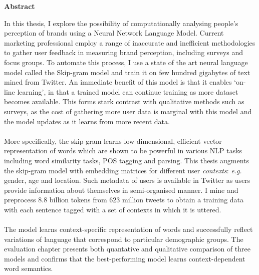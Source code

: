 \newpage
{\Huge \bf Abstract}
\vspace{24pt} 
\onehalfspacing


In this thesis, I explore the possibility of computationally analysing people's perception of brands using a Neural Network Language Model. Current marketing professional employ a range of inaccurate and inefficient methodologies to gather user feedback in measuring brand perception, including surveys and focus groups. To automate this process, I use a state of the art neural language model called the Skip-gram model and train it on few hundred gigabytes of text mined from Twitter. An immediate benefit of this model is that it enables `on-line learning', in that a trained model can continue training as more dataset becomes available. This forms stark contrast with qualitative methods such as surveys, as the cost of gathering more user data is marginal with this model and the model updates as it learns from more recent data.
\\ \\
More specifically, the skip-gram learns low-dimensional, efficient vector representation of words which are shown to be powerful in various NLP tasks including word similarity tasks, POS tagging and parsing. This thesis augments the skip-gram model with embedding matrices for different user \textit{contexts}: \textit{e.g.} gender, age and location. Such metadata of users is available in Twitter as users provide information about themselves in semi-organised manner. I mine and preprocess 8.8 billion tokens from 623 million tweets to obtain a training data with each sentence tagged with a set of contexts in which it is uttered.
\\ \\
The model learns context-specific representation of words and successfully reflect variations of language that correspond to particular demographic groups. The evaluation chapter presents both quantative and qualitative comparison of three models and confirms that the best-performing model learns context-dependent word semantics.   

\newpage
\vspace*{\fill}
